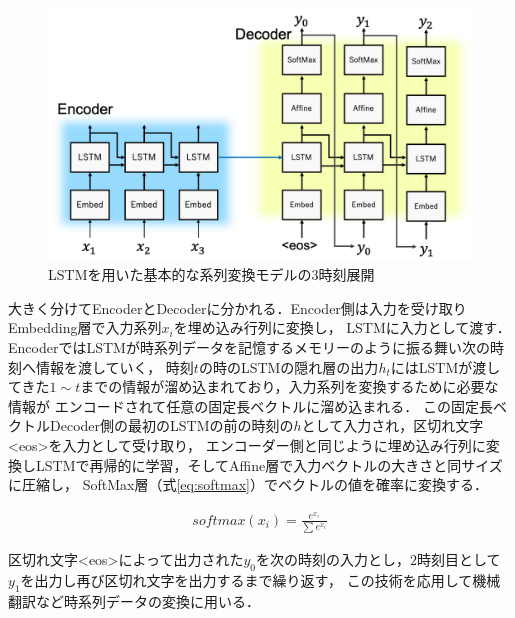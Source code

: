 \documentclass[a4j,11pt,report]{jsbook}
\begin{document}
\begin{center}
  \begin{figure}[tbh]
    \centering
    \includegraphics[width=\linewidth]{image/seq2seq_image.png}
    \caption{LSTMを用いた基本的な系列変換モデルの3時刻展開　}
    \label{fig:seq2seq_3time}
  \end{figure}
\end{center}

大きく分けてEncoderとDecoderに分かれる．Encoder側は入力を受け取りEmbedding層で入力系列$x_{i}$を埋め込み行列に変換し，
LSTMに入力として渡す．EncoderではLSTMが時系列データを記憶するメモリーのように振る舞い次の時刻へ情報を渡していく，
時刻$t$の時のLSTMの隠れ層の出力$h_{t}$にはLSTMが渡してきた$1 \sim t$までの情報が溜め込まれており，入力系列を変換するために必要な情報が
エンコードされて任意の固定長ベクトルに溜め込まれる．
この固定長ベクトルDecoder側の最初のLSTMの前の時刻の$h$として入力され，区切れ文字<eos>を入力として受け取り，
エンコーダー側と同じように埋め込み行列に変換しLSTMで再帰的に学習，そしてAffine層で入力ベクトルの大きさと同サイズに圧縮し，
SoftMax層（式\ref{eq:softmax}）でベクトルの値を確率に変換する．

\begin{equation}
  \label{eq:softmax}
  \begin{split}
    softmax(x_{i}) = \frac{ e^{x_{i}} }{ \sum e^{x_{i}} }
  \end{split}
\end{equation}

区切れ文字<eos>によって出力された$y_{0}$を次の時刻の入力とし，$2$時刻目として$y_{1}$を出力し再び区切れ文字を出力するまで繰り返す，
この技術を応用して機械翻訳など時系列データの変換に用いる．
\end{document}

